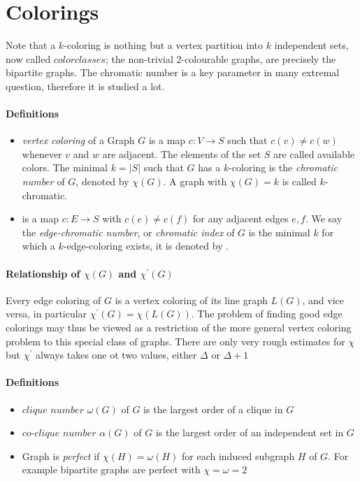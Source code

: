 \section{Colorings}
Note that a $k$-coloring is nothing but a vertex partition into 
$k$ independent sets, now called $ color classes$; the non-trivial
2-colourable graphs, are precisely the bipartite graphs.
The chromatic number is a key parameter in many extremal question, therefore
it is studied a lot.

\paragraph{Definitions}
\begin{itemize}
    \item \textit{vertex coloring} of a Graph $ G $ is a map 
    $c: V \to S $ such that $ c(v) \neq c(w) $ whenever $ v $ and 
    $ w $ are adjacent. The elements of the set $ S $ are called 
    available colors. The minimal $ k = |S| $ such that $ G $ has a
    $k$-coloring is the \textit{chromatic number} of $ G $, denoted 
    by $ \chi(G) $. A graph with $ \chi(G) = k $ is called $k$-chromatic.

    \item {} is a map $c: E \to S $ with $ c(e) \neq c(f) $
    for any adjacent edges $ e,f $. We say the \textit{edge-chromatic number},
    or \textit{chromatic index} of $ G $ is the minimal $ k $ for which 
    a $k$-edge-coloring exists, it is denoted by . 
\end{itemize}

\paragraph{Relationship of $\chi(G)$ and $\chi^\prime(G)$}
Every edge coloring of $ G $ is a vertex coloring of its line graph
$ L(G) $, and vice versa, in particular $ \chi^\prime(G) = \chi(L(G))$.
The problem of finding good edge colorings may thus be viewed as a 
restriction of the more general vertex coloring problem to this special 
class of graphs. There are only very rough estimates for $\chi$ but 
$\chi^\prime$ always takes one ot two values, either $ \Delta $ or 
$ \Delta + 1$

\paragraph{Definitions}
\begin{itemize}
    \item $clique$ $number$ $\omega(G)$ of $G$ is the largest 
    order of a clique in $G$

    \item $co$-$clique$ $number$ $\alpha(G)$ of $G$ is the largest order of an 
    independent set in $G$

    \item  Graph is \textit{perfect} if $\chi(H) = \omega(H)$ for each induced
    subgraph $H$ of $G$. For example bipartite graphs are perfect with
    $\chi=\omega=2$
\end{itemize}

